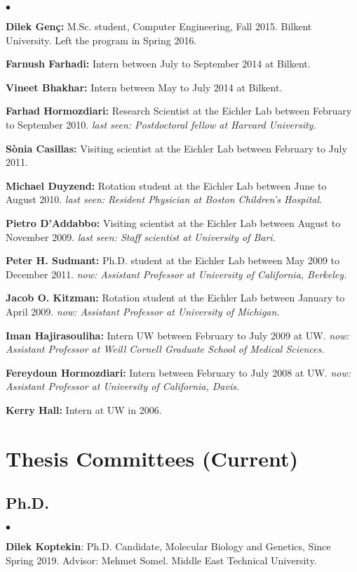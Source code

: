 \documentclass[margin,line]{res}
\newenvironment{list2}{
  \begin{list}{$\bullet$}{%
      \setlength{\itemsep}{0.1cm}
      \setlength{\parsep}{0in} \setlength{\parskip}{0in}
      \setlength{\topsep}{0in} \setlength{\partopsep}{0in} 
      \setlength{\leftmargin}{0.2in}}}{\end{list}}
\begin{document}
\begin{resume}
\begin{list2}
\item
{\bf Dilek Genç:} M.Sc. student, Computer Engineering, Fall 2015.
  Bilkent University. Left the program in Spring 2016. 
\item
  {\bf Farnush Farhadi:} Intern between July to September 2014 at Bilkent.
\item
  {\bf Vineet Bhakhar:} Intern between May to July 2014 at Bilkent. 
\item
  {\bf Farhad Hormozdiari:} Research Scientist at the Eichler Lab between February to September 2010.
  {\it last seen: Postdoctoral fellow  at Harvard University.}
\item
  {\bf S\`{o}nia Casillas:} Visiting scientist at the Eichler Lab between February to July 2011.
\item
  {\bf Michael Duyzend:} Rotation student at the Eichler Lab between June to August 2010.
  {\it last seen:  Resident Physician at Boston Children's Hospital.}
\item
  {\bf Pietro D'Addabbo:} Visiting scientist at the Eichler Lab between August to November 2009.
  {\it last seen: Staff scientist at University of Bari.}
\item
  {\bf Peter H. Sudmant:} Ph.D. student at the Eichler Lab between May 2009 to December 2011.
  {\it now: Assistant Professor at University of California, Berkeley.}
\item
  {\bf Jacob O. Kitzman:} Rotation student at the Eichler Lab between January to April 2009.
  {\it now: Assistant Professor at University of Michigan.}
\item
  {\bf Iman Hajirasouliha:}  Intern UW between February to July 2009 at UW.
  {\it now: Assistant Professor at Weill Cornell Graduate School of Medical Sciences.}
\item
  {\bf Fereydoun Hormozdiari:} Intern between February to July 2008 at UW. 
  {\it now: Assistant Professor at University of California, Davis.}
\item
  {\bf Kerry Hall:} Intern at UW in 2006.  
\end{list2}

\clearpage

\section{\sc Thesis Committees (Current)}

\vspace*{-.4cm}
\subsection{\small \sc Ph.D.}
\begin{list2}
\item
{\bf Dilek Koptekin}: Ph.D. Candidate, Molecular Biology and Genetics, Since Spring 2019.
Advisor: Mehmet Somel. Middle East Technical University.
\end{list2}


\end{resume}
\end{document}
